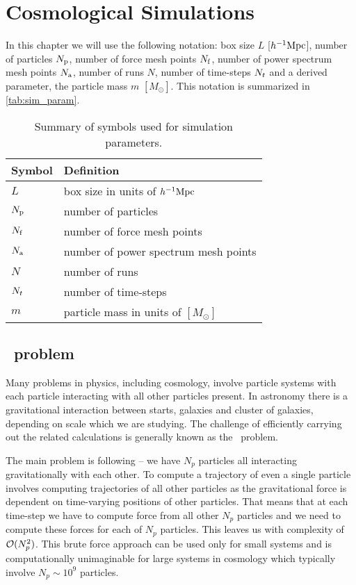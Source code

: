\chapter{Cosmological Simulations}
\label{chpt:cosmo_sim}


In this chapter we will use the following notation: box size $L$ [$h^{-1}\text{Mpc}$], number of particles $N_{\rm p}$, number of force mesh points $N_{\rm f}$, number of power spectrum mesh points $N_{\rm a}$, number of runs $N$, number of time-steps $N_t$ and a derived parameter, the particle mass $m$ $[M_\odot]$. This notation is summarized in \autoref{tab:sim_param}.

\begin{table}
\begin{tabular}{ll}
    \hline \hline
    Symbol & Definition \\
    \hline
    $L$ & box size in units of $h^{-1}\text{Mpc}$ \\
    $N_{\rm p}$ & number of particles \\
    $N_{\rm f}$ & number of force mesh points \\
    $N_{\rm a}$ & number of power spectrum mesh points \\
    $N$ & number of runs \\
    $N_t$ & number of time-steps \\
    $m$ & particle mass in units of $[M_\odot]$ \\
    \hline \hline
\end{tabular}
\caption{Summary of symbols used for simulation parameters.}
\label{tab:sim_param}
\end{table}


\section{\nbody\ problem}
Many problems in physics, including cosmology, involve particle systems with each particle interacting with all other particles present. In astronomy there is a gravitational interaction between starts, galaxies and cluster of galaxies, depending on scale which we are studying. The challenge of efficiently carrying out the related calculations is generally known as the \nbody\ problem.

The main problem is following -- we have $N_p$ particles all interacting gravitationally with each other. To compute a trajectory of even a single particle involves computing trajectories of all other particles as the gravitational force is dependent on time-varying positions of other particles. That means that at each time-step we have to compute force from all other $N_p$ particles and we need to compute these forces for each of $N_p$ particles. This leaves us with complexity of \(\mathcal{O}(N_p^2)\). This brute force approach can be used only for small systems and is computationally unimaginable for large systems in cosmology which typically involve \(N_p\sim10^{9}\) particles.

